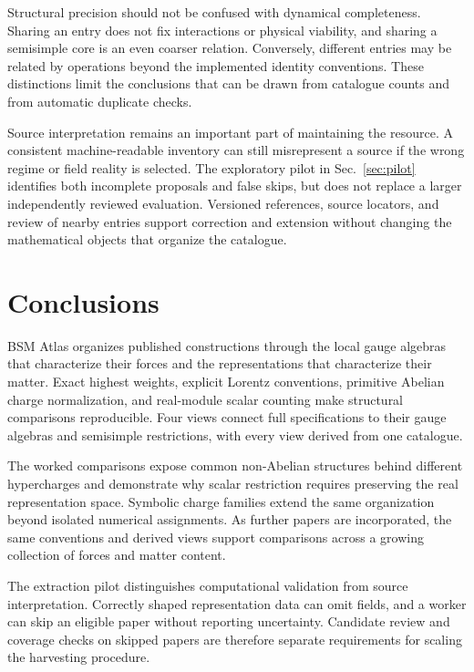 Structural precision should not be confused with dynamical completeness. Sharing an entry does not fix interactions or physical viability, and sharing a semisimple core is an even coarser relation. Conversely, different entries may be related by operations beyond the implemented identity conventions. These distinctions limit the conclusions that can be drawn from catalogue counts and from automatic duplicate checks.

Source interpretation remains an important part of maintaining the resource. A consistent machine-readable inventory can still misrepresent a source if the wrong regime or field reality is selected. The exploratory pilot in Sec.~\ref{sec:pilot} identifies both incomplete proposals and false skips, but does not replace a larger independently reviewed evaluation. Versioned references, source locators, and review of nearby entries support correction and extension without changing the mathematical objects that organize the catalogue.

\section{Conclusions}

BSM Atlas organizes published constructions through the local gauge algebras that characterize their forces and the representations that characterize their matter. Exact highest weights, explicit Lorentz conventions, primitive Abelian charge normalization, and real-module scalar counting make structural comparisons reproducible. Four views connect full specifications to their gauge algebras and semisimple restrictions, with every view derived from one catalogue.

The worked comparisons expose common non-Abelian structures behind different hypercharges and demonstrate why scalar restriction requires preserving the real representation space. Symbolic charge families extend the same organization beyond isolated numerical assignments. As further papers are incorporated, the same conventions and derived views support comparisons across a growing collection of forces and matter content.

The extraction pilot distinguishes computational validation from source interpretation. Correctly shaped representation data can omit fields, and a worker can skip an eligible paper without reporting uncertainty. Candidate review and coverage checks on skipped papers are therefore separate requirements for scaling the harvesting procedure.

